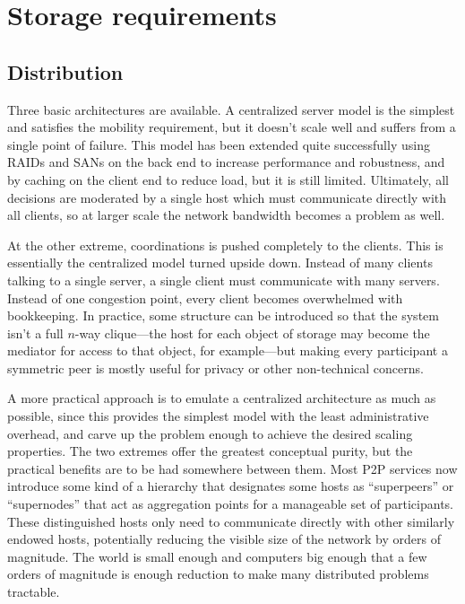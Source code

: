 \section{Storage requirements}

\subsection{Distribution}

Three basic architectures are available. A centralized server model is the simplest and satisfies the mobility requirement, but it doesn't scale well and suffers from a single point of failure. This model has been extended quite successfully using RAIDs and SANs on the back end to increase performance and robustness, and by caching on the client end to reduce load, but it is still limited. Ultimately, all decisions are moderated by a single host which must communicate directly with all clients, so at larger scale the network bandwidth becomes a problem as well.

At the other extreme, coordinations is pushed completely to the clients. This is essentially the centralized model turned upside down. Instead of many clients talking to a single server, a single client must communicate with many servers. Instead of one congestion point, every client becomes overwhelmed with bookkeeping. In practice, some structure can be introduced so that the system isn't a full $n$-way clique---the host for each object of storage may become the mediator for access to that object, for example---but making every participant a symmetric peer is mostly useful for privacy or other non-technical concerns.

A more practical approach is to emulate a centralized architecture as much as possible, since this provides the simplest model with the least administrative overhead, and carve up the problem enough to achieve the desired scaling properties. The two extremes offer the greatest conceptual purity, but the practical benefits are to be had somewhere between them. Most P2P services now introduce some kind of a hierarchy that designates some hosts as ``superpeers'' or ``supernodes'' that act as aggregation points for a manageable set of participants. These distinguished hosts only need to communicate directly with other similarly endowed hosts, potentially reducing the visible size of the network by orders of magnitude. The world is small enough and computers big enough that a few orders of magnitude is enough reduction to make many distributed problems tractable.

